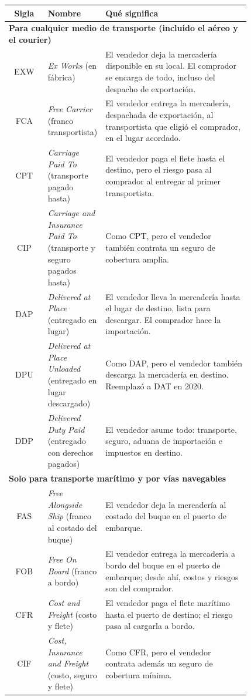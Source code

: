 \begin{center}
\small
\begin{tabular}{|c|>{\raggedright\arraybackslash}p{0.22\linewidth}|p{0.60\linewidth}|}
\hline
\textbf{Sigla} & \textbf{Nombre} & \textbf{Qué significa} \\ \hline
\multicolumn{3}{|l|}{\textbf{Para cualquier medio de transporte (incluido el aéreo y el courier)}} \\ \hline
EXW & \textit{Ex Works} (en fábrica) & El vendedor deja la mercadería disponible en su
local. El comprador se encarga de todo, incluso del despacho de exportación. \\ \hline
FCA & \textit{Free Carrier} (franco transportista) & El vendedor entrega la mercadería,
despachada de exportación, al transportista que eligió el comprador, en el lugar acordado. \\ \hline
CPT & \textit{Carriage Paid To} (transporte pagado hasta) & El vendedor paga el flete hasta
el destino, pero el riesgo pasa al comprador al entregar al primer transportista. \\ \hline
CIP & \textit{Carriage and Insurance Paid To} (transporte y seguro pagados hasta) & Como CPT,
pero el vendedor también contrata un seguro de cobertura amplia. \\ \hline
DAP & \textit{Delivered at Place} (entregado en lugar) & El vendedor lleva la mercadería
hasta el lugar de destino, lista para descargar. El comprador hace la importación. \\ \hline
DPU & \textit{Delivered at Place Unloaded} (entregado en lugar descargado) & Como DAP, pero
el vendedor también descarga la mercadería en destino. Reemplazó a DAT en 2020. \\ \hline
DDP & \textit{Delivered Duty Paid} (entregado con derechos pagados) & El vendedor asume
todo: transporte, seguro, aduana de importación e impuestos en destino. \\ \hline
\multicolumn{3}{|l|}{\textbf{Solo para transporte marítimo y por vías navegables}} \\ \hline
FAS & \textit{Free Alongside Ship} (franco al costado del buque) & El vendedor deja la
mercadería al costado del buque en el puerto de embarque. \\ \hline
FOB & \textit{Free On Board} (franco a bordo) & El vendedor entrega la mercadería a bordo
del buque en el puerto de embarque; desde ahí, costos y riesgos son del comprador. \\ \hline
CFR & \textit{Cost and Freight} (costo y flete) & El vendedor paga el flete marítimo hasta
el puerto de destino; el riesgo pasa al cargarla a bordo. \\ \hline
CIF & \textit{Cost, Insurance and Freight} (costo, seguro y flete) & Como CFR, pero el
vendedor contrata además un seguro de cobertura mínima. \\ \hline
\end{tabular}
\end{center}

